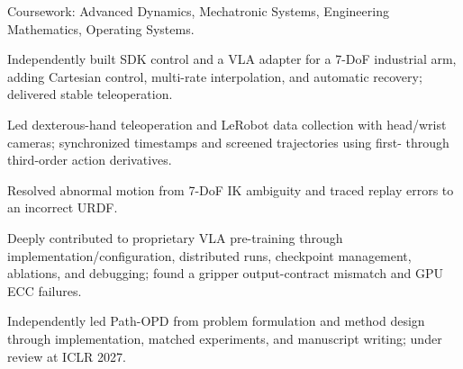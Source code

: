 \documentclass[10pt,a4paper]{article}
\begin{document}

\begin{cvitems}
  \item Coursework: Advanced Dynamics, Mechatronic Systems, Engineering Mathematics, Operating Systems.
\end{cvitems}

\vspace{1.4pt}

\begin{cvitems}
  \item Independently built SDK control and a VLA adapter for a 7-DoF industrial arm, adding Cartesian control, multi-rate interpolation, and automatic recovery; delivered stable teleoperation.
  \item Led dexterous-hand teleoperation and LeRobot data collection with head/wrist cameras; synchronized timestamps and screened trajectories using first- through third-order action derivatives.
  \item Resolved abnormal motion from 7-DoF IK ambiguity and traced replay errors to an incorrect URDF.
  \item Deeply contributed to proprietary VLA pre-training through implementation/configuration, distributed runs, checkpoint management, ablations, and debugging; found a gripper output-contract mismatch and GPU ECC failures.
  \item Independently led Path-OPD from problem formulation and method design through implementation, matched experiments, and manuscript writing; under review at ICLR 2027.
\end{cvitems}
\end{document}
